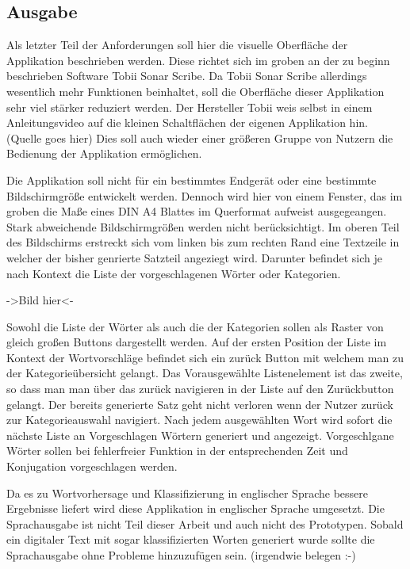         
    \newpage
	\subsection{Ausgabe}
        
        Als letzter Teil der Anforderungen soll hier die visuelle Oberfläche der Applikation beschrieben werden. Diese richtet sich im groben an der zu beginn beschrieben Software Tobii Sonar Scribe. Da Tobii Sonar Scribe allerdings wesentlich mehr Funktionen beinhaltet, soll die Oberfläche dieser Applikation sehr viel stärker reduziert werden. Der Hersteller Tobii weis selbst in einem Anleitungsvideo auf die kleinen Schaltflächen der eigenen Applikation hin. (Quelle goes hier) Dies soll auch wieder einer größeren Gruppe von Nutzern die Bedienung der Applikation ermöglichen.
        
        Die Applikation soll nicht für ein bestimmtes Endgerät oder eine bestimmte Bildschirmgröße entwickelt werden. Dennoch wird hier von einem Fenster, das im groben die Maße eines DIN A4 Blattes im Querformat aufweist ausgegeangen. Stark abweichende Bildschirmgrößen werden nicht berücksichtigt. Im oberen Teil des Bildschirms erstreckt sich vom linken bis zum rechten Rand eine Textzeile in welcher der bisher genrierte Satzteil angeziegt wird. Darunter befindet sich je nach Kontext die Liste der vorgeschlagenen Wörter oder Kategorien.
        
        ->Bild hier<-
        
        Sowohl die Liste der Wörter als auch die der Kategorien sollen als Raster von gleich großen Buttons dargestellt werden. Auf der ersten Position der Liste im Kontext der Wortvorschläge befindet sich ein zurück Button mit welchem man zu der Kategorieübersicht gelangt. Das Vorausgewählte Listenelement ist das zweite, so dass man man über das zurück navigieren in der Liste auf den Zurückbutton gelangt. Der bereits generierte Satz geht nicht verloren wenn der Nutzer zurück zur Kategorieauswahl navigiert. Nach jedem ausgewählten Wort wird sofort die nächste Liste an Vorgeschlagen Wörtern generiert und angezeigt. Vorgeschlgane Wörter sollen bei fehlerfreier Funktion in der entsprechenden Zeit und Konjugation vorgeschlagen werden.
        
        Da es zu Wortvorhersage und Klassifizierung in englischer Sprache bessere Ergebnisse liefert wird diese Applikation in englischer Sprache umgesetzt. Die Sprachausgabe ist nicht Teil dieser Arbeit und auch nicht des Prototypen. Sobald ein digitaler Text mit sogar klassifizierten Worten generiert wurde sollte die Sprachausgabe ohne Probleme hinzuzufügen sein. (irgendwie belegen :-) 
        
	\newpage

    
    
    
    
    
    
    
    
    
    
    
    
    
    
    
    
    
    
    
    